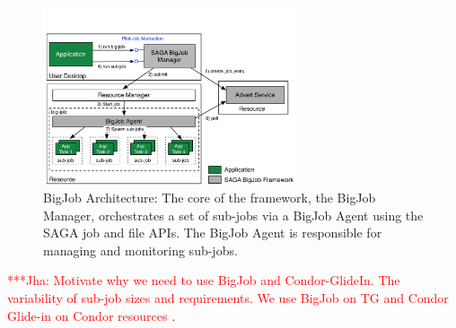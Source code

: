 \documentclass{rspublic}
\newcommand{\up}{\vspace*{-0.3em}}
\newcommand{\jhanote}[1]{ {\textcolor{red} { ***Jha: #1 }}}
\newcommand{\jhanote}[1]{}
\begin{document}
\begin{figure}[ht]
    \centering
    \includegraphics[width=0.66\textwidth]{./bigjob.pdf}
   \caption{BigJob Architecture: The core of the framework, the
      BigJob Manager, orchestrates a set of sub-jobs via a
      BigJob Agent using the SAGA job and file APIs.  The
      BigJob Agent is responsible for managing and monitoring sub-jobs.\up}
   \label{fig:bigjob}
\end{figure}

\jhanote{Motivate why we need to use BigJob and Condor-GlideIn. The
  variability of sub-job sizes and requirements. We use BigJob on TG
  and Condor Glide-in on Condor resources}.
\end{document}
